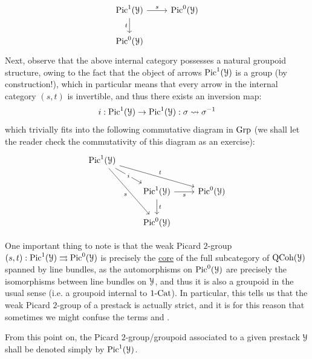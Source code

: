 \begin{definition}
\begin{enumerate}
\begin{enumerate}
$$\begin{tikzcd}
                                        	{\Pic^1(\calY)} & {\Pic^0(\calY)} \\
                                        	{\Pic^0(\calY)}
                                        	\arrow["t"', from=1-1, to=2-1]
                                        	\arrow["s", from=1-1, to=1-2]
                                        \end{tikzcd}
                                    $$
                                Next, observe that the above internal category possesses a natural groupoid structure, owing to the fact that the object of arrows $\mathrm{Pic}^1(\mathcal{Y})$ is a group (by construction!), which in particular means that every arrow in the internal category $(s, t)$ is invertible, and thus there exists an inversion map:
                                    $$i: \mathrm{Pic}^1(\mathcal{Y}) \to \mathrm{Pic}^1(\mathcal{Y}): \sigma \leadsto \sigma^{-1}$$
                                which trivially fits into the following commutative diagram in $\mathrm{Grp}$ (we shall let the reader check the commutativity of this diagram as an exercise):
                                    $$
                                        \begin{tikzcd}
                                        	{\Pic^1(\calY)} \\
                                        	& {\Pic^1(\calY)} & {\Pic^0(\calY)} \\
                                        	& {\Pic^0(\calY)}
                                        	\arrow["t", from=2-2, to=3-2]
                                        	\arrow["s"', from=2-2, to=2-3]
                                        	\arrow["i"{description}, from=1-1, to=2-2]
                                        	\arrow["s"', from=1-1, to=3-2]
                                        	\arrow["t", from=1-1, to=2-3]
                                        \end{tikzcd}
                                    $$
                                    
                                One important thing to note is that the weak Picard $2$-group $(s, t): \mathrm{Pic}^1(\mathcal{Y}) \rightrightarrows \mathrm{Pic}^0(\mathcal{Y})$ is precisely the \href{https://ncatlab.org/nlab/show/core}{\underline{core}} of the full subcategory of $\mathrm{QCoh}(\mathcal{Y})$ spanned by line bundles, as the automorphisms on $\mathrm{Pic}^0(\mathcal{Y})$ are precisely the isomorphisms between line bundles on $\mathcal{Y}$, and thus it is also a groupoid in the usual sense (i.e. a groupoid internal to $1\text{-}\mathrm{Cat}$). In particular, this tells us that the weak Picard $2$-group of a prestack is actually strict, and it is for this reason that sometimes we might confuse the terms  and .
                                
                                From this point on, the Picard $2$-group/groupoid associated to a given prestack $\mathcal{Y}$ shall be denoted simply by $\mathrm{Pic}^1(\mathcal{Y})$.
                            \end{enumerate}
                    \end{enumerate}
                \end{definition}
